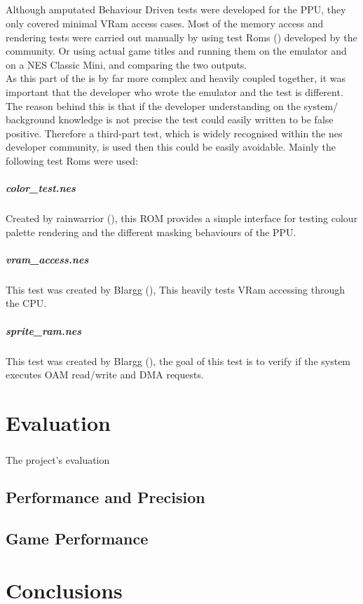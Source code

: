 \documentclass[]{report}
\begin{document}
\paragraph{ }
Although amputated Behaviour Driven tests were developed for the PPU, they only covered minimal VRam access cases. Most of the memory access and rendering tests were carried out manually by using test Roms (\cite{TRIN}) developed by the community. Or using actual game titles and running them on the emulator and on a NES Classic Mini, and comparing the two outputs.
\\
As this part of the is by far more complex and heavily coupled together, it was important that the developer who wrote the emulator and the test is different. The reason behind this is that if the developer understanding on the system/ background knowledge is not precise the test could easily written to be false positive. Therefore a third-part test, which is widely recognised within the nes developer community, is used then this could be easily avoidable. Mainly the following test Roms were used: 

\paragraph{color\_test.nes}
Created by rainwarrior (\cite{RNTS}), this ROM provides a simple interface for testing colour palette rendering and the different masking behaviours of the PPU.

\paragraph{vram\_access.nes}
This test was created by Blargg (\cite{BLGT}), This heavily tests VRam accessing through the CPU.

\paragraph{sprite\_ram.nes}
This test was created by Blargg (\cite{BLGT}), the goal of this test is to verify if the system executes OAM read/write and DMA requests.

 \chapter{Evaluation}
 \paragraph{ }
 The project's evaluation 

\section{Performance and Precision}

\section{Game Performance}

\chapter{Conclusions}

\printbibliography
\end{document}
